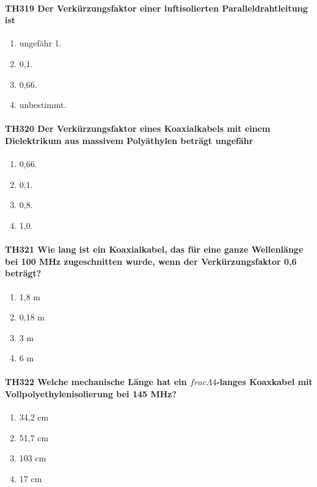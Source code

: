 \documentclass[8pt]{article}
\begin{document}
\paragraph*{TH319 Der Verkürzungsfaktor einer luftisolierten Paralleldrahtleitung ist}
\begin{enumerate}[nolistsep,label=\Alph*]
\item ungefähr 1.
\item 0,1.
\item 0,66.
\item unbestimmt.
\end{enumerate}

\paragraph*{TH320 Der Verkürzungsfaktor eines Koaxialkabels mit einem Dielektrikum aus massivem Polyäthylen beträgt ungefähr}
\begin{enumerate}[nolistsep,label=\Alph*]
\item 0,66.
\item 0,1.
\item 0,8.
\item 1,0.
\end{enumerate}

\paragraph*{TH321 Wie lang ist ein Koaxialkabel, das für eine ganze Wellenlänge bei 100 MHz zugeschnitten wurde, wenn der Verkürzungsfaktor 0,6 beträgt?}
\begin{enumerate}[nolistsep,label=\Alph*]
\item 1,8 m
\item 0,18 m
\item 3 m
\item 6 m
\end{enumerate}

\paragraph*{TH322 Welche mechanische Länge hat ein $frac{\Lambda}{4}$-langes Koaxkabel mit Vollpolyethylenisolierung bei 145 MHz?}
\begin{enumerate}[nolistsep,label=\Alph*]
\item 34,2 cm
\item 51,7 cm
\item 103 cm
\item 17 cm
\end{enumerate}
\end{document}
